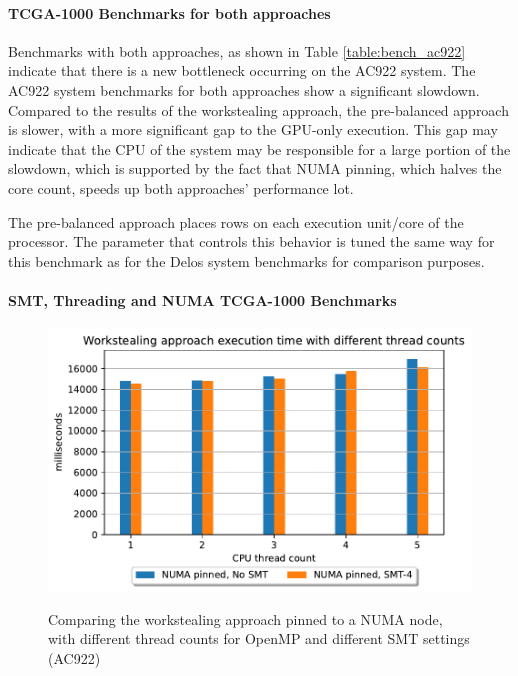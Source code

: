 \paragraph{TCGA-1000 Benchmarks for both approaches}


Benchmarks with both approaches, as shown in Table \ref{table:bench_ac922} indicate that there is a new bottleneck occurring on the AC922 system. The AC922 system benchmarks for both approaches show a significant slowdown. Compared to the results of the workstealing approach, the pre-balanced approach is slower, with a more significant gap to the GPU-only execution. This gap may indicate that the CPU of the system may be responsible for a large portion of the slowdown, which is supported by the fact that NUMA pinning, which halves the core count, speeds up both approaches' performance lot.

The pre-balanced approach places rows on each execution unit/core of the processor. The parameter that controls this behavior is tuned the same way for this benchmark as for the Delos system benchmarks for comparison purposes.


\paragraph{SMT, Threading and NUMA TCGA-1000 Benchmarks}
\begin{figure}[H]
  \caption{Comparing the workstealing approach pinned to a NUMA node, with different thread counts for OpenMP and different SMT settings (AC922)}
  \includegraphics[width=\textwidth]{figures/ac922_threadcount.pdf}
  \centering
  \label{fig:threadcount_ac922}
\end{figure}

